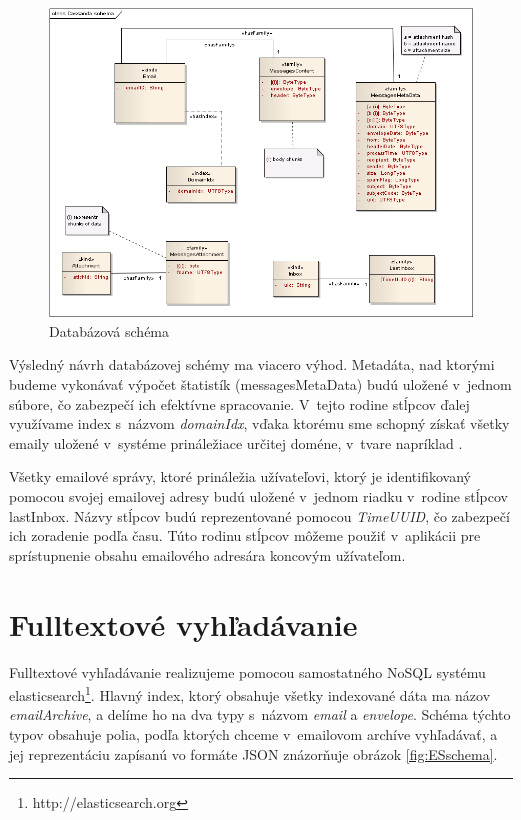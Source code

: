 \documentclass[11pt,twoside,a4paper]{book}
\begin{document}
\begin{figure}[h]
 \centering
 \includegraphics[width=17cm]{./figures/cassandra.png}
 \caption{Databázová schéma}
 \label{fig:Cschema}
\end{figure}

Výsledný návrh databázovej schémy ma viacero výhod. Metadáta, nad ktorými budeme vykonávať výpočet štatistík (messagesMetaData) budú uložené v~jednom súbore, čo zabezpečí ich efektívne spracovanie. V~tejto rodine stĺpcov ďalej využívame index s~názvom \emph{domainIdx}, vďaka ktorému sme schopný získať všetky emaily uložené v~systéme prináležiace určitej doméne, v~tvare napríklad . 

Všetky emailové správy, ktoré prináležia užívateľovi, ktorý je identifikovaný pomocou svojej emailovej adresy budú uložené v~jednom riadku v~rodine stĺpcov lastInbox. Názvy stĺpcov budú reprezentované pomocou \emph{TimeUUID}, čo zabezpečí ich zoradenie podľa času. Túto rodinu stĺpcov môžeme použiť v~aplikácii pre sprístupnenie obsahu emailového adresára koncovým užívateľom.





\section{Fulltextové vyhľadávanie}

Fulltextové vyhľadávanie realizujeme pomocou samostatného NoSQL systému elasticsearch\footnote{http://elasticsearch.org}. Hlavný index, ktorý obsahuje všetky indexované dáta ma názov \emph{emailArchive}, a delíme ho na dva typy s~názvom \emph{email} a \emph{envelope}. Schéma týchto typov obsahuje polia, podľa ktorých chceme v~emailovom archíve vyhľadávať, a jej reprezentáciu zapísanú vo formáte JSON znázorňuje obrázok \ref{fig:ESschema}.
\end{document}
